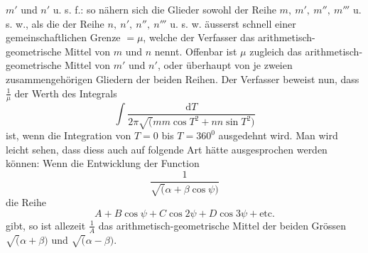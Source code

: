 $m'$ und $n'$ u. s. f.: so nähern sich die Glieder sowohl der Reihe $m,\ m',\ m'',\ m'''$ u. s. w.,
als die der Reihe $n,\ n',\ n'',\ n'''$ u. s. w. äusserst schnell einer gemeinschaftlichen
Grenze $=\mu$, welche der Verfasser das arithmetisch-geometrische Mittel von
$m$ und $n$ nennt. Offenbar ist $\mu$ zugleich das arithmetisch-geometrische Mittel
von $m'$ und $n'$, oder überhaupt von je zweien zusammengehörigen Gliedern der
beiden Reihen. Der Verfasser beweist nun, dass $\frac{1}{\mu}$ der Werth des Integrals
\[
\int\frac{\mathrm{d}T}{2\pi\surd(mm\cos T^{2}+nn\sin T^{2})}
\]
ist, wenn die Integration von $T=0$ bis $T=360^{0}$ ausgedehnt wird. Man
wird leicht sehen, dass diess auch auf folgende Art hätte ausgesprochen werden
können: Wenn die Entwicklung der Function
\[
\frac{1}{\surd(\alpha+\beta\cos\psi)}
\]
die Reihe
\[
A+B\cos\psi+C\cos2\psi+D\cos3\psi+\mathrm{etc.}
\]
gibt, so ist allezeit $\frac{1}{A}$ das arithmetisch-geometrische Mittel der beiden Grössen
$\surd(\alpha+\beta)$ und $\surd(\alpha-\beta)$.

